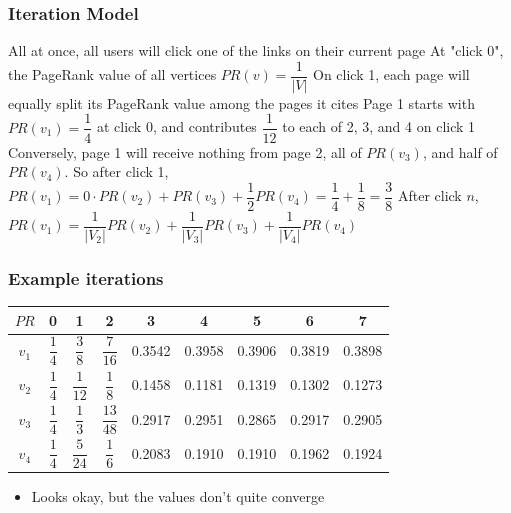\documentclass{beamer}
\begin{document}
\begin{frame}[t]
\frametitle{Iteration Model}
\begin{outline}
    \1 All at once, all users will click one of the links on their current page
    \1 At "click 0", the PageRank value of all vertices $PR(v) = \dfrac{1}{|V|}$
    \1 On click 1, each page will equally split its PageRank value among the pages it cites
    \1 Page 1 starts with $PR(v_1) = \dfrac{1}{4}$ at click 0, and contributes $\dfrac{1}{12}$ to each of 2, 3, and 4 on click 1
    \1 Conversely, page 1 will receive nothing from page 2, all of $PR(v_3)$, and half of $PR(v_4)$. So after click 1, $PR(v_1) = 0\cdot PR(v_2) + PR(v_3) + \dfrac{1}{2}PR(v_4) = \dfrac{1}{4} + \dfrac{1}{8} = \dfrac{3}{8}$
    \1 After click $n$, $PR(v_1) = \dfrac{1}{|V_2|}PR(v_2) + \dfrac{1}{|V_3|}PR(v_3) + \dfrac{1}{|V_4|}PR(v_4)$
\end{outline}
\end{frame}

\begin{frame}
\frametitle{Example iterations}
\bgroup
\def\arraystretch{2.5}
\begin{tabular}{|c|c|c|c|c|c|c|c|c|}
    \hline
    $PR$ & 0 & 1 & 2 & 3 & 4 & 5 & 6 & 7\\
    \hline
    $v_1$ & $\dfrac{1}{4}$ & $\dfrac{3}{8}$ & $\dfrac{7}{16}$ & 0.3542 & 0.3958 & 0.3906& 0.3819 & 0.3898\\
    $v_2$ & $\dfrac{1}{4}$ & $\dfrac{1}{12}$ & $\dfrac{1}{8}$ & 0.1458 & 0.1181 & 0.1319& 0.1302 & 0.1273\\
    $v_3$ & $\dfrac{1}{4}$ & $\dfrac{1}{3}$ & $\dfrac{13}{48}$ & 0.2917 & 0.2951 & 0.2865& 0.2917 & 0.2905\\
    $v_4$ & $\dfrac{1}{4}$ & $\dfrac{5}{24}$ & $\dfrac{1}{6}$ & 0.2083 & 0.1910 & 0.1910 & 0.1962 & 0.1924\\
    \hline
\end{tabular}
\egroup
\begin{itemize}
    \item Looks okay, but the values don't quite converge
\end{itemize}
\end{frame}
\end{document}
